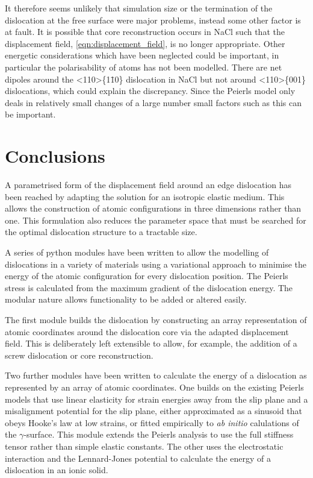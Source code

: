 It therefore seems unlikely that simulation size or the termination of the dislocation at the free surface were major problems, instead some other factor is at fault. It is possible that core reconstruction occurs in NaCl such that the displacement field, \autoref{eqn:displacement_field}, is no longer appropriate. Other energetic considerations which have been neglected could be important, in particular the polarisability of atoms has not been modelled. There are net dipoles around the <110>\{1\={1}0\} dislocation in NaCl but not around <110>\{001\} dislocations, which could explain the discrepancy. Since the Peierls model only deals in relatively small changes of a large number small factors such as this can be important.


\section{Conclusions}

A parametrised form of the displacement field around an edge dislocation has been reached by adapting the solution for an isotropic elastic medium. This allows the construction of atomic configurations in three dimensions rather than one. This formulation also reduces the parameter space that must be searched for the optimal dislocation structure to a tractable size.

A series of python modules have been written to allow the modelling of dislocations in a variety of materials using a variational approach to minimise the energy of the atomic configuration for every dislocation position. The Peierls stress is calculated from the maximum gradient of the dislocation energy. The modular nature allows functionality to be added or altered easily. 

The first module builds the dislocation by constructing an array representation of atomic coordinates around the dislocation core via the adapted displacement field. This is deliberately left extensible to allow, for example, the addition of a screw dislocation or core reconstruction.

Two further modules have been written to calculate the energy of a dislocation as represented by an array of atomic coordinates. One builds on the existing Peierls models that use linear elasticity for strain energies away from the slip plane and a misalignment potential for the slip plane, either approximated as a sinusoid that obeys Hooke's law at low strains, or fitted empirically to \emph{ab initio} calulations of the $\gamma$-surface. This module extends the Peierls analysis to use the full stiffness tensor rather than simple elastic constants. The other uses the electrostatic interaction and the Lennard-Jones potential to calculate the energy of a dislocation in an ionic solid.

